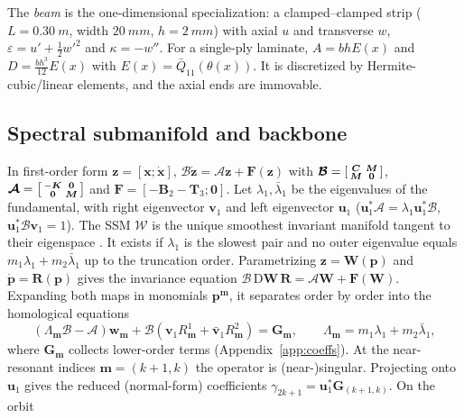 The \emph{beam} is the one-dimensional specialization: a clamped--clamped strip
($L=\SI{0.30}{m}$, width $\SI{20}{mm}$, $h=\SI{2}{mm}$) with axial $u$ and transverse
$w$, $\varepsilon=u'+\tfrac12w'^2$ and $\kappa=-w''$. For a single-ply laminate,
$A=bhE(x)$ and $D=\tfrac{bh^3}{12}E(x)$ with $E(x)=\bar Q_{11}(\theta(x))$. It is
discretized by Hermite-cubic/linear elements, and the axial ends are immovable.

\subsection{Spectral submanifold and backbone}\label{sec:ssm}
In first-order form $\bm z=[\bm x;\dot{\bm x}]$,
$\bm{\mathcal B}\dot{\bm z}=\bm{\mathcal A}\bm z+\bm F(\bm z)$ with
$\bm{\mathcal B}=\begin{bsmallmatrix}\bm C&\bm M\\\bm M&\bm0\end{bsmallmatrix}$,
$\bm{\mathcal A}=\begin{bsmallmatrix}-\bm K&\bm0\\\bm0&\bm M\end{bsmallmatrix}$ and
$\bm F=[-\bm B_2-\bm T_3;\bm0]$. Let $\lambda_1,\bar\lambda_1$ be the eigenvalues of the
fundamental, with right eigenvector $\bm v_1$ and left eigenvector $\bm u_1$
($\bm u_1^*\bm{\mathcal A}=\lambda_1\bm u_1^*\bm{\mathcal B}$,
$\bm u_1^*\bm{\mathcal B}\bm v_1=1$). The SSM $\mathcal W$ is the unique smoothest
invariant manifold tangent to their eigenspace \cite{haller2016}. It exists if
$\lambda_1$ is the slowest pair and no outer eigenvalue equals
$m_1\lambda_1+m_2\bar\lambda_1$ up to the truncation order. Parametrizing
$\bm z=\bm W(\bm p)$ and $\dot{\bm p}=\bm R(\bm p)$ gives the invariance equation
$\bm{\mathcal B}\,\mathrm D\bm W\,\bm R=\bm{\mathcal A}\bm W+\bm F(\bm W)$. Expanding both
maps in monomials $\bm p^{\bm m}$, it separates order by order into the homological
equations
\begin{equation}
(\Lambda_{\bm m}\bm{\mathcal B}-\bm{\mathcal A})\bm w_{\bm m}
+\bm{\mathcal B}(\bm v_1R^1_{\bm m}+\bar{\bm v}_1R^2_{\bm m})=\bm G_{\bm m},
\qquad \Lambda_{\bm m}=m_1\lambda_1+m_2\bar\lambda_1,
\label{eq:homological}
\end{equation}
where $\bm G_{\bm m}$ collects lower-order terms (Appendix~\ref{app:coeffs}). At the
near-resonant indices $\bm m=(k{+}1,k)$ the operator is (near-)singular. Projecting onto
$\bm u_1$ gives the reduced (normal-form) coefficients
$\gamma_{2k+1}=\bm u_1^*\bm G_{(k+1,k)}$. On the orbit
